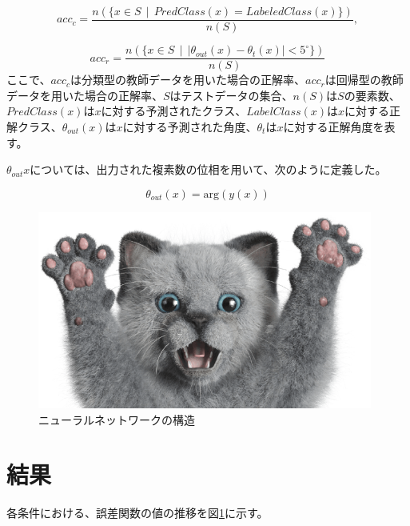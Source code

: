 \documentclass[11pt,a4paper,uplatex]{ujarticle}
\begin{document}
  \begin{equation}
    acc_{c} = \frac{n(\{x \in S \, \mid\, PredClass(x) = LabeledClass(x)\})}{n(S)},
  \end{equation} %

  \begin{equation}
    acc_{r} = \frac{n(\{x \in S \, \mid\, |\theta_{out}(x) - \theta_{t}(x)| < 5^{\circ}\})}{n(S)}
  \end{equation} %
  ここで、$acc_c$は分類型の教師データを用いた場合の正解率、$acc_r$は回帰型の教師データを用いた場合の正解率、$S$はテストデータの集合、$n(S)$は$S$の要素数、
  $PredClass(x)$は$x$に対する予測されたクラス、$LabelClass(x)$は$x$に対する正解クラス、$\theta_{out}(x)$は$x$に対する予測された角度、$\theta_{t}$は$x$に対する正解角度を表す。

  $\theta_{out}{x}$については、出力された複素数の位相を用いて、次のように定義した。

  \begin{equation}
    \theta_{out}(x) = \mathrm{arg}(y(x))
  \end{equation} %

  \begin{figure}[hbtp]
    \centering
    \includegraphics[keepaspectratio, width=110mm]{Images/sampleneko.png}
    \caption{ニューラルネットワークの構造}
    \label{fig:neuralnet}
  \end{figure}
  

\section{結果}
  各条件における、誤差関数の値の推移を図\ref{}に示す。
\end{document}
